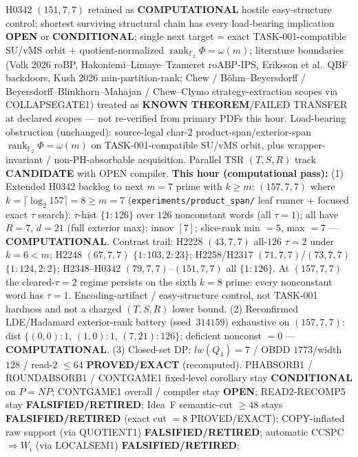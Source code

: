 \documentclass[11pt]{article}
\begin{document}
H0342 $(151,7,7)$ retained as \textbf{COMPUTATIONAL} hostile easy-structure control;
shortest surviving structural chain has every load-bearing implication \textbf{OPEN} or
\textbf{CONDITIONAL}; single next target = exact TASK-001-compatible SU/vMS orbit +
quotient-normalized $\operatorname{rank}_{\mathbb F_2}\Phi=\omega(m)$;
literature boundaries (Volk 2026 roBP, Hakoniemi--Limaye--Tzameret roABP-IPS,
Eriksson et al.\ QBF backdoors, Kush 2026 min-partition-rank; Chew / B\"ohm--Beyersdorff /
Beyersdorff--Blinkhorn--Mahajan / Chew--Clymo strategy-extraction scopes via COLLAPSEGATE1)
treated as \textbf{KNOWN THEOREM}/FAILED TRANSFER at declared scopes --- not re-verified from
primary PDFs this hour.
Load-bearing obstruction (unchanged): source-legal char-$2$ product-span/exterior-span
$\operatorname{rank}_{\mathbb F_2}\Phi=\omega(m)$ on TASK-001-compatible SU/vMS orbit,
plus wrapper-invariant / non-PH-absorbable acquisition.
Parallel TSR $(T,S,R)$ track \textbf{CANDIDATE} with OPEN compiler.
\textbf{This hour (computational pass):}
(1) Extended H0342 backlog to next $m{=}7$ prime with $k{\ge}m$:
$(157,7,7)$ where $k=\lceil\log_2 157\rceil=8{\ge}m{=}7$
(\texttt{experiments/product\_span/} leaf runner + focused exact $\tau$ search):
$\tau$-hist $\{1{:}126\}$ over $126$ nonconstant words (all $\tau{=}1$);
all have $R{=}7$, $d{=}21$ (full exterior max); innov $[7]$;
slice-rank min $=5$, max $=7$ --- \textbf{COMPUTATIONAL}.
Contrast trail: H2228 $(43,7,7)$ all-$126$ $\tau{=}2$ under $k{=}6{<}m$;
H2248 $(67,7,7)$ $\{1{:}103,2{:}23\}$; H2258/H2317 $(71,7,7)$/$(73,7,7)$ $\{1{:}124,2{:}2\}$;
H2348--H0342 $(79,7,7)$--$(151,7,7)$ all $\{1{:}126\}$.
At $(157,7,7)$ the cleared-$\tau{=}2$ regime persists on the sixth $k{=}8$ prime:
every nonconstant word has $\tau{=}1$. Encoding-artifact / easy-structure control,
not TASK-001 hardness and not a charged $(T,S,R)$ lower bound.
(2) Reconfirmed LDE/Hadamard exterior-rank battery (seed~$314159$) exhaustive on
$(157,7,7)$: dist $\{(0,0){:}1,\,(1,0){:}1,\,(7,21){:}126\}$; deficient nonconst $=0$ ---
\textbf{COMPUTATIONAL}.
(3) Closed-set DP: $lw(Q_4)=7$ / OBDD $1773$/width $128$ / read-$2$ $\le64$
\textbf{PROVED/EXACT} (recomputed).
PHABSORB1 / ROUNDABSORB1 / CONTGAME1 fixed-level corollary stay \textbf{CONDITIONAL} on $P=NP$;
CONTGAME1 overall / compiler stay \textbf{OPEN}; READ2-RECOMP5 stay \textbf{FALSIFIED/RETIRED};
Idea~F semantic-cut $\ge48$ stays \textbf{FALSIFIED/RETIRED} (exact cut $=8$ PROVED/EXACT);
COPY-inflated raw support (via QUOTIENT1) \textbf{FALSIFIED/RETIRED};
automatic CCSPC$\Rightarrow W_i$ (via LOCALSEM1) \textbf{FALSIFIED/RETIRED};
\end{document}
